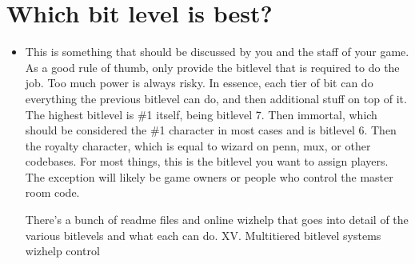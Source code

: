 \documentclass[letterpaper,10pt,english]{sphinxmanual}
\begin{document}
\section{Which bit level is best?}
\label{\detokenize{12-advanced:which-bit-level-is-best}}\begin{itemize}
\item {} 
\sphinxAtStartPar
This is something that should be discussed by you and the staff
of your game.  As a good rule of thumb, only provide the bitlevel
that is required to do the job.  Too much power is always risky.
In essence, each tier of bit can do everything the previous bitlevel
can do, and then additional stuff on top of it.  The highest bitlevel
is \#1 itself, being bitlevel 7.  Then immortal, which should be
considered the \#1 character in most cases and is bitlevel 6.  Then
the royalty character, which is equal to wizard on penn, mux, or
other codebases.  For most things, this is the bitlevel you want
to assign players.  The exception will likely be game owners or
people who control the master room code.

\sphinxAtStartPar
There’s a bunch of readme files and online wizhelp that goes into
detail of the various bitlevels and what each can do.
\sphinxhyphen{} XV.   Multi\sphinxhyphen{}tiered bitlevel systems
\sphinxhyphen{} wizhelp control

\end{itemize}
\end{document}

